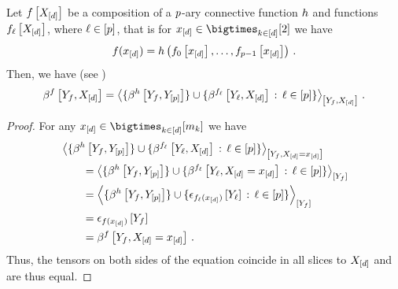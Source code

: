 \begin{lemma}
    \label{lem:formulaDecomp}
    Let $f\left[X_{[d]}\right]$ be a composition of a $p$-ary connective function $h$ and functions $f_{\ell}\left[X_{[d]}\right]$, where $\ell\in[p]$, that is for $\shortcatindices\in\atomstates$ we have
    \begin{align*}
        f(x_{[d]})
        = h\left(f_{0}\left[x_{[d]}\right], \dots, f_{p-1}\left[x_{[d]}\right]\right) \, .
    \end{align*}
    Then, we have (see )
    \begin{align*}
        \bencodingofat{\formula}{\headvariableof{\formula},\shortcatvariables}
        = \contractionof{
            \{\bencodingofat{\chainingfunction}{\headvariableof{\formula},\headvariables}\}
            \cup \{\bencodingofat{\formulaof{\selindex}}{\headvariableof{\selindex},\shortcatvariables} \wcols \selindexin\}
        }{\headvariableof{\formula},\shortcatvariables} \, .
    \end{align*}
\end{lemma}
\begin{proof}
    For any $\shortcatindicesin$ we have
    \begin{align*}
        &\contractionof{
            \{\bencodingofat{\chainingfunction}{\headvariableof{\formula},\headvariables}\}
            \cup \{\bencodingofat{\formulaof{\selindex}}{\headvariableof{\selindex},\shortcatvariables} \wcols \selindexin\}
        }{\headvariableof{\formula},\indexedshortcatvariables} \\
        &\quad\quad= \contractionof{
            \{\bencodingofat{\chainingfunction}{\headvariableof{\formula},\headvariables}\}
            \cup \{\bencodingofat{\formulaof{\selindex}}{\headvariableof{\selindex},\indexedshortcatvariables} \wcols \selindexin\}
        }{\headvariableof{\formula}} \\
        &\quad\quad= \contractionof{
            \{\bencodingofat{\chainingfunction}{\headvariableof{\formula},\headvariables}\}
            \cup \{\onehotmapofat{\formulaof{\selindex}(\shortcatindices)}{\headvariableof{\selindex}} \wcols \selindexin\}
        }{\headvariableof{\formula}} \\
        &\quad\quad= \onehotmapofat{\formula(\shortcatindices)}{\headvariableof{\formula}}\\
        &\quad\quad= \bencodingofat{\formula}{\headvariableof{\formula},\indexedshortcatvariables} \, .
    \end{align*}
    Thus, the tensors on both sides of the equation coincide in all slices to $X_{[d]}$ and are thus equal.
\end{proof}


